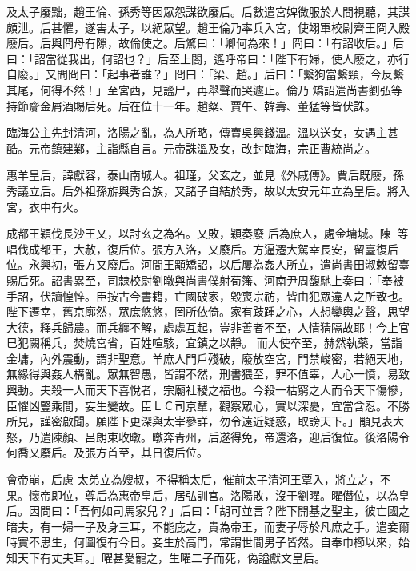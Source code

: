 \begin{pinyinscope}
 及太子廢黜，趙王倫、孫秀等因眾怨謀欲廢后。后數遣宮婢微服於人間視聽，其謀頗泄。后甚懼，遂害太子，以絕眾望。趙王倫乃率兵入宮，使翊軍校尉齊王冏入殿廢后。后與冏母有隙，故倫使之。后驚曰：「卿何為來！」冏曰：「有詔收后。」后曰：「詔當從我出，何詔也？」后至上閤，遙呼帝曰：「陛下有婦，使人廢之，亦行自廢。」又問冏曰：「起事者誰？」冏曰：「梁、趙。」后曰：「繫狗當繫頸，今反繫其尾，何得不然！」至宮西，見謐尸，再舉聲而哭遽止。倫乃
 矯詔遣尚書劉弘等持節齎金屑酒賜后死。后在位十一年。趙粲、賈午、韓壽、董猛等皆伏誅。



 臨海公主先封清河，洛陽之亂，為人所略，傳賣吳興錢溫。溫以送女，女遇主甚酷。元帝鎮建鄴，主詣縣自言。元帝誅溫及女，改封臨海，宗正曹統尚之。



 惠羊皇后，諱獻容，泰山南城人。祖瑾，父玄之，並見《外戚傳》。賈后既廢，孫秀議立后。后外祖孫旂與秀合族，又諸子自結於秀，故以太安元年立為皇后。將入宮，衣中有火。



 成都王穎伐長沙王乂，以討玄之為名。乂敗，穎奏廢
 后為庶人，處金墉城。陳等唱伐成都王，大赦，復后位。張方入洛，又廢后。方逼遷大駕幸長安，留臺復后位。永興初，張方又廢后。河間王顒矯詔，以后屢為姦人所立，遣尚書田淑敕留臺賜后死。詔書累至，司隸校尉劉暾與尚書僕射荀籓、河南尹周馥馳上奏曰：「奉被手詔，伏讀惶悴。臣按古今書籍，亡國破家，毀喪宗祊，皆由犯眾違人之所致也。陛下遷幸，舊京廓然，眾庶悠悠，罔所依倚。家有跂踵之心，人想鑾輿之聲，思望大德，釋兵歸農。而兵纏不解，處處互起，豈非善者不至，人情猜隔故耶！今上官巳犯闕稱兵，焚燒宮省，百姓喧駭，宜鎮之以靜。
 而大使卒至，赫然執藥，當詣金墉，內外震動，謂非聖意。羊庶人門戶殘破，廢放空宮，門禁峻密，若絕天地，無緣得與姦人構亂。眾無智愚，皆謂不然，刑書猥至，罪不值辜，人心一憤，易致興動。夫殺一人而天下喜悅者，宗廟社稷之福也。今殺一枯窮之人而令天下傷慘，臣懼凶豎乘間，妄生變故。臣ＬＣ司京輦，觀察眾心，實以深憂，宜當含忍。不勝所見，謹密啟聞。願陛下更深與太宰參詳，勿令遠近疑惑，取謗天下。」顒見表大怒，乃遣陳顏、呂朗東收暾。暾奔青州，后遂得免，帝還洛，迎后復位。後洛陽令何喬又廢后。及張方首至，其日復后位。



 會帝崩，后慮
 太弟立為嫂叔，不得稱太后，催前太子清河王覃入，將立之，不果。懷帝即位，尊后為惠帝皇后，居弘訓宮。洛陽敗，沒于劉曜。曜僭位，以為皇后。因問曰：「吾何如司馬家兒？」后曰：「胡可並言？陛下開基之聖主，彼亡國之暗夫，有一婦一子及身三耳，不能庇之，貴為帝王，而妻子辱於凡庶之手。遣妾爾時實不思生，何圖復有今日。妾生於高門，常謂世間男子皆然。自奉巾櫛以來，始知天下有丈夫耳。」曜甚愛寵之，生曜二子而死，偽謚獻文皇后。




\end{pinyinscope}
